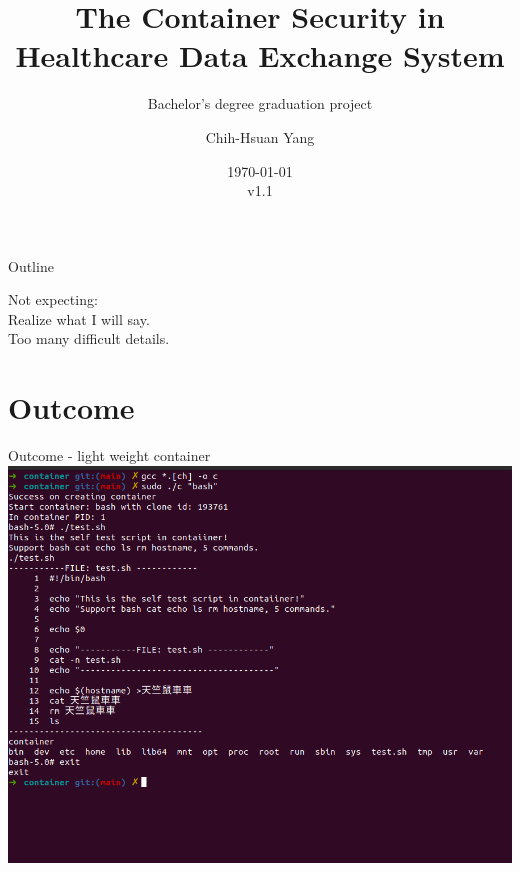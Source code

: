 \documentclass{beamer}
\title{The Container Security in Healthcare Data Exchange System}
\subtitle{Bachelor's degree graduation project}
\author{Chih-Hsuan Yang}
\institute{National Sun Yat-sen University\\
Advisor: Chun-I Fan
}
\date{\today\\v1.1}
\begin{document}
\begin{frame}
    \titlepage
\end{frame}

\begin{frame}{Outline}
    \begin{multicols}{2}
        \tableofcontents
    \end{multicols}
\end{frame}

\begin{frame}
    \begin{center}
        \Large{Not expecting:}\\
        \huge{Realize what I will say.}\\
        \footnotesize{Too many difficult details.}
    \end{center}
\end{frame}

\section{Outcome}
\begin{frame}{Outcome - light weight container}
    \centering\includegraphics[width=.9\textwidth]{lc.png}
\end{frame}
\end{document}
